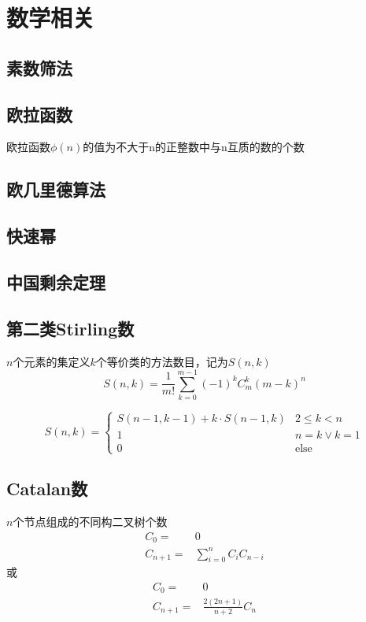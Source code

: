 
\section{数学相关}

\subsection{素数筛法}

\subsection{欧拉函数}
欧拉函数$\phi(n)$的值为不大于n的正整数中与n互质的数的个数

\subsection{欧几里德算法}

\subsection{快速幂}

\subsection{中国剩余定理}

\subsection{第二类Stirling数}
$n$个元素的集定义$k$个等价类的方法数目，记为$S(n,k)$
\begin{displaymath}
S(n, k) = \frac{1}{m!}\sum_{k=0}^{m-1}{(-1)^k C_m^k (m-k)^n}
\end{displaymath}

\begin{displaymath}
S(n, k) = 
\begin{cases}
S(n-1, k-1) + k\cdot S(n-1, k) & 2\leqslant k < n\\
1 & n=k \vee k=1 \\
0 & \text{else}
\end{cases}
\end{displaymath}
$$ $$

\subsection{Catalan数}
$n$个节点组成的不同构二叉树个数
\begin{align*}
C_0     = & 0 \\
C_{n+1} = & \sum_{i=0}^n C_i C_{n-i}
\end{align*}
或
\begin{align*}
C_0     = & 0 \\
C_{n+1} = & \frac{2(2n+1)}{n+2} C_n
\end{align*}

